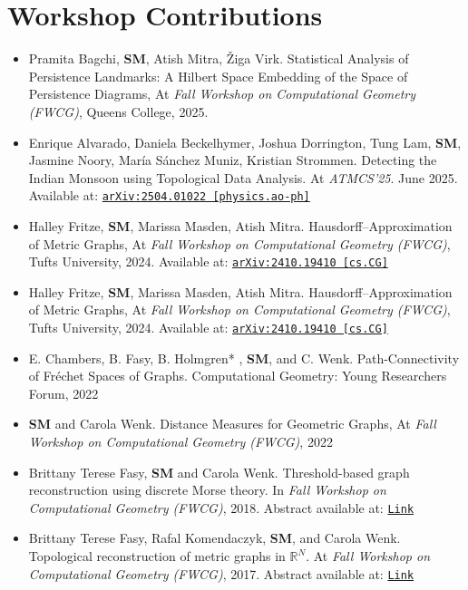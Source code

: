 \documentclass[11pt]{article}
\begin{document}
\section{Workshop Contributions}
\begin{itemize}
\item[8.] Pramita Bagchi, \textbf{SM}, Atish Mitra, \v{Z}iga Virk. Statistical Analysis of Persistence Landmarks: A Hilbert Space
Embedding of the Space of Persistence Diagrams, At \emph{Fall Workshop on Computational Geometry (FWCG)}, Queens College, 2025. 

\item[7.] Enrique Alvarado, Daniela Beckelhymer, Joshua Dorrington, Tung Lam, \textbf{SM}, Jasmine Noory, María Sánchez Muniz, Kristian Strommen. Detecting the Indian Monsoon using Topological Data Analysis. At \emph{ATMCS'25}. June 2025.
Available at:
\href{https://arxiv.org/abs/2504.01022}{\tt arXiv:2504.01022 [physics.ao-ph]}

\item[6.] Halley Fritze, \textbf{SM}, Marissa Masden, Atish Mitra. Hausdorff--Approximation of Metric Graphs, At \emph{Fall Workshop on Computational Geometry (FWCG)}, Tufts University, 2024. 
Available at:
\href{https://arxiv.org/abs/2410.19410}{\tt arXiv:2410.19410 [cs.CG]}

\item[5.] Halley Fritze, \textbf{SM}, Marissa Masden, Atish Mitra. Hausdorff--Approximation of Metric Graphs, At \emph{Fall Workshop on Computational Geometry (FWCG)}, Tufts University, 2024. 
Available at:
\href{https://arxiv.org/abs/2410.19410}{\tt arXiv:2410.19410 [cs.CG]}

\item[4.] E. Chambers, B. Fasy, B. Holmgren* , \textbf{SM}, and C. Wenk.
Path-Connectivity of Fr\'echet Spaces of Graphs. Computational Geometry: Young
Researchers Forum, 2022

\item[3.] \textbf{SM} and Carola Wenk. Distance Measures for Geometric
Graphs, At \emph{Fall Workshop on Computational Geometry (FWCG)}, 2022
  
\item[2.] Brittany Terese Fasy, \textbf{SM} and Carola Wenk. Threshold-based
  graph reconstruction using discrete Morse theory. In \emph{Fall Workshop on
  Computational Geometry (FWCG)}, 2018. Abstract available at:
  \href{https://arxiv.org/abs/1911.12865}{\tt Link}
 
\item[1.] Brittany Terese Fasy, Rafal Komendaczyk, \textbf{SM}, and Carola
  Wenk. Topological reconstruction of metric graphs in $\mathbb R^N$. At
  \emph{Fall Workshop on Computational Geometry (FWCG)}, 2017. Abstract
  available at:
  \href{http://www.ams.stonybrook.edu/~jsbm/fwcg17/proceedings.pdf} {\tt Link}
\end{itemize}
\end{document}
